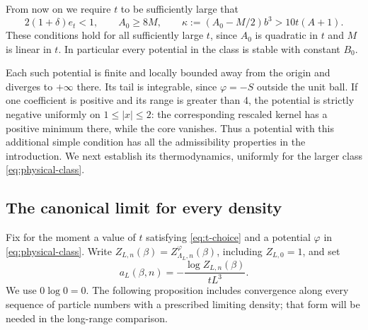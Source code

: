 From now on we require $t$ to be sufficiently large that
\begin{equation}
 2(1+\delta)e_t<1,
 \qquad A_0\ge8M,
 \qquad \kappa:=(A_0-M/2)b^3>10t(A+1).
 \label{eq:t-choice}
\end{equation}
These conditions hold for all sufficiently large $t$, since $A_0$ is
quadratic in $t$ and $M$ is linear in $t$. In particular every potential
in the class is stable with constant $B_0$.

Each such potential is finite and locally bounded away from the origin
and diverges to $+\infty$ there. Its tail is integrable, since
$\varphi=-S$ outside the unit ball. If one coefficient is positive
and its range is greater than 4, the potential is strictly negative
uniformly on $1\le |x|\le2$: the corresponding rescaled kernel has
a positive minimum there, while the core vanishes. Thus a potential
with this additional simple condition has all the admissibility
properties in the introduction. We next establish its thermodynamics,
uniformly for the larger class \eqref{eq:physical-class}.

\subsection{The canonical limit for every density}

Fix for the moment a value of $t$ satisfying \eqref{eq:t-choice} and
a potential $\varphi$ in \eqref{eq:physical-class}. Write
$Z_{L,n}(\beta)=Z_{\Lambda_L,n}^\varphi(\beta)$, including
$Z_{L,0}=1$, and set
\[
 a_L(\beta,n)=-\frac{\log Z_{L,n}(\beta)}{tL^3}.
\]
We use $0\log0=0$. The following proposition includes convergence
along every sequence of particle numbers with a prescribed limiting
density; that form will be needed in the long-range comparison.

